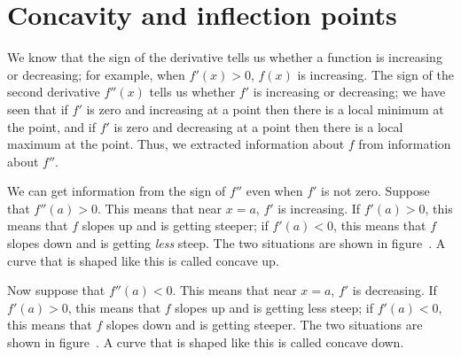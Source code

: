 \section{Concavity and inflection points} {}{}
\nobreak
We know that the sign of the derivative tells us whether a function is
increasing or decreasing; for example, when $f'(x)>0$,
$f(x)$ is increasing. The sign of the second derivative
$f''(x)$ tells us whether $f'$ is increasing or decreasing; we have
seen that if $f'$ is zero and increasing at a point then there is a
local minimum at the point, and if $f'$ is zero and decreasing at a
point then there is a local maximum at the point. Thus, we extracted
information about $f$ from information about $f''$. 

We can get information from the sign of $f''$ even when $f'$ is not
zero. Suppose that $f''(a)>0$. This means that near $x=a$, $f'$ is
increasing. If $f'(a)>0$, this means that $f$ slopes up and is getting
steeper; if $f'(a)<0$, this means that $f$ slopes down and is getting
{\it less\/} steep. The two situations are shown in
figure~. A curve that is shaped like this is
called {\dfont concave up.}


Now suppose that $f''(a)<0$. This means that near $x=a$, $f'$ is
decreasing. If $f'(a)>0$, this means that $f$ slopes up and is getting
less steep; if $f'(a)<0$, this means that $f$ slopes down and is getting
steeper. The two situations are shown in
figure~. A curve that is shaped like this is
called {\dfont concave down.}


